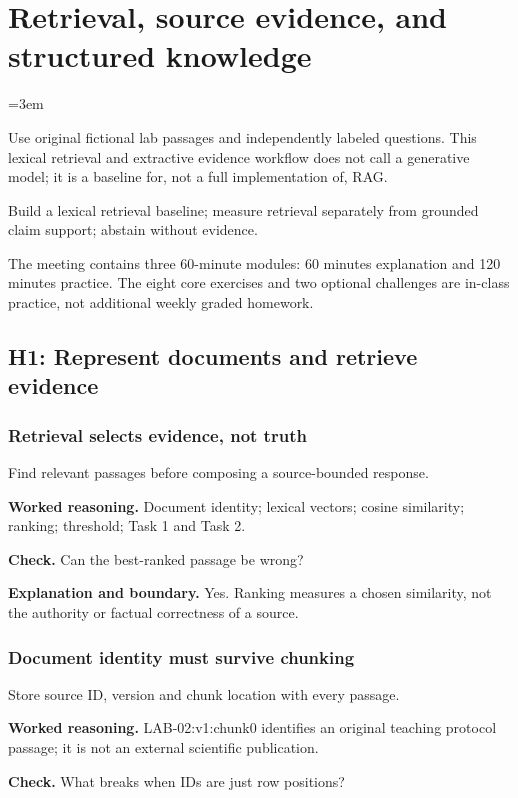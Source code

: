 \chapter{Retrieval, source evidence, and structured knowledge}\label{chap:w13-studio}\label{chap:retrieval}
\emergencystretch=3em

Use original fictional lab passages and independently labeled questions. This lexical retrieval and extractive evidence workflow does not call a generative model; it is a baseline for, not a full implementation of, RAG.
\begin{learningbox}Build a lexical retrieval baseline; measure retrieval separately from grounded claim support; abstain without evidence.\end{learningbox}
The meeting contains three 60-minute modules: 60 minutes explanation and 120 minutes practice. The eight core exercises and two optional challenges are in-class practice, not additional weekly graded homework.
\section{H1: Represent documents and retrieve evidence}
\subsection{Retrieval selects evidence, not truth}
Find relevant passages before composing a source-bounded response.

\textbf{Worked reasoning.} Document identity; lexical vectors; cosine similarity; ranking; threshold; Task 1 and Task 2.

\textbf{Check.} Can the best-ranked passage be wrong?

\textbf{Explanation and boundary.} Yes. Ranking measures a chosen similarity, not the authority or factual correctness of a source.

\subsection{Document identity must survive chunking}
Store source ID, version and chunk location with every passage.

\textbf{Worked reasoning.} LAB-02:v1:chunk0 identifies an original teaching protocol passage; it is not an external scientific publication.

\textbf{Check.} What breaks when IDs are just row positions?

